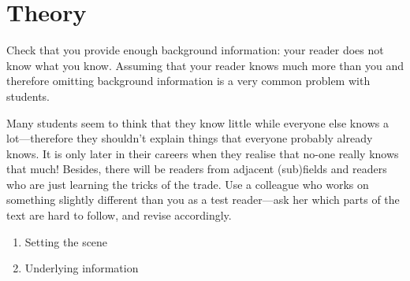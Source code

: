 \chapter{Theory} \label{Chapter: Theory}

Check that you provide enough background information: your reader does not know what you know. Assuming that your reader knows much more than you and therefore omitting background information is a very common problem with students.

Many students seem to think that they know little while everyone else knows a lot—therefore they shouldn’t explain things that everyone probably already knows. It is only later in their careers when they realise that no-one really knows that much! Besides, there will be readers from adjacent (sub)fields and readers who are just learning the tricks of the trade. Use a colleague who works on something slightly different than you as a test reader—ask her which parts of the text are hard to follow, and revise accordingly.

\begin{enumerate}
\item Setting the scene
\item Underlying information
\end{enumerate}